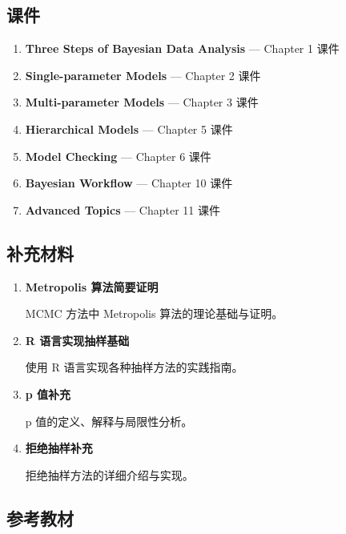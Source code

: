 \subsection{课件}

\begin{enumerate}
  \item \textbf{Three Steps of Bayesian Data Analysis} — Chapter 1 课件

  \item \textbf{Single-parameter Models} — Chapter 2 课件

  \item \textbf{Multi-parameter Models} — Chapter 3 课件

  \item \textbf{Hierarchical Models} — Chapter 5 课件

  \item \textbf{Model Checking} — Chapter 6 课件

  \item \textbf{Bayesian Workflow} — Chapter 10 课件

  \item \textbf{Advanced Topics} — Chapter 11 课件
\end{enumerate}

\subsection{补充材料}

\begin{enumerate}
  \item \textbf{Metropolis 算法简要证明}

  MCMC 方法中 Metropolis 算法的理论基础与证明。

  \item \textbf{R 语言实现抽样基础}

  使用 R 语言实现各种抽样方法的实践指南。

  \item \textbf{p 值补充}

  p 值的定义、解释与局限性分析。

  \item \textbf{拒绝抽样补充}

  拒绝抽样方法的详细介绍与实现。
\end{enumerate}

\subsection{参考教材}

